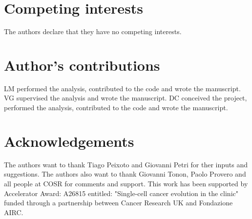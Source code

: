\documentclass{bmcart}
\begin{document}
\begin{backmatter}

\section*{Competing interests}
  The authors declare that they have no competing interests.

\section*{Author's contributions}
LM performed the analysis, contributed to the code and wrote the manuscript. VG supervised the analysis and wrote the manuscript. DC conceived the project, performed the analysis, contributed to the code and wrote the manuscript.

\section*{Acknowledgements}
The authors want to thank Tiago Peixoto and Giovanni Petri for ther inputs and suggestions.  The authors also want to thank Giovanni Tonon, Paolo Provero and all people at COSR for comments and support.
This work has been supported by Accelerator Award: A26815 entitled:  "Single-cell cancer evolution in the clinic" funded through a partnership between Cancer Research UK and Fondazione AIRC.




\end{backmatter}
\end{document}
